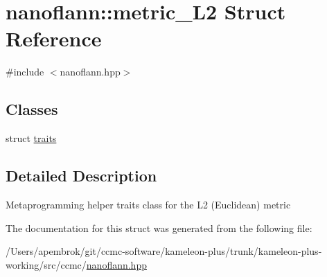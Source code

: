 \hypertarget{structnanoflann_1_1metric___l2}{\section{nanoflann\-:\-:metric\-\_\-\-L2 Struct Reference}
\label{structnanoflann_1_1metric___l2}
}


{\ttfamily \#include $<$nanoflann.\-hpp$>$}

\subsection*{Classes}
\begin{DoxyCompactItemize}
\item 
struct \hyperlink{structnanoflann_1_1metric___l2_1_1traits}{traits}
\end{DoxyCompactItemize}


\subsection{Detailed Description}
Metaprogramming helper traits class for the L2 (Euclidean) metric 

The documentation for this struct was generated from the following file\-:\begin{DoxyCompactItemize}
\item 
/\-Users/apembrok/git/ccmc-\/software/kameleon-\/plus/trunk/kameleon-\/plus-\/working/src/ccmc/\hyperlink{nanoflann_8hpp}{nanoflann.\-hpp}\end{DoxyCompactItemize}
